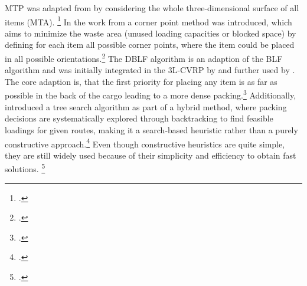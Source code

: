\gls{MTP} was adapted from \cite{tarantilis_hybrid_2009} by considering the whole three-dimensional
surface of all items (\gls{MTA}). \footcite[cf.][pp. 258--260]{tarantilis_hybrid_2009}
In the work from \cite{tao_effective_2015} a corner point method
was introduced, which aims to minimize the waste area (unused loading capacities or blocked space) by
defining for each item all possible corner points, where the item could be placed in all possible
orientations.\footcite[cf.][pp. 130--132]{tao_effective_2015} The \gls{DBLF} algorithm
is an adaption of the \gls{BLF} algorithm and was initially integrated in the \gls{3L-CVRP} by \cite{wang_two_2010}
and further used by \cite{krebs_advanced_2021}.
The core adaption is, that the first priority for placing any item is as far as possible in the back of the cargo
leading to a more dense packing.\footcites(cf.)()[pp. 259--263]{wang_two_2010}[p. 8f]{krebs_axle_2021}
Additionally, \cite{bortfeldt_hybrid_2012} introduced a tree search algorithm as part of a hybrid method,
where packing decisions are systematically explored through backtracking to find feasible loadings for
given routes, making it a search-based heuristic rather than a purely constructive approach.\footcite[cf.][p. 2251f]{bortfeldt_hybrid_2012}
Even though constructive heuristics are quite simple, they are still widely used because of their simplicity and efficiency to obtain fast solutions.
\footcite[cf.][pp. 11--13]{tamke_branch-and-cut_2024}

